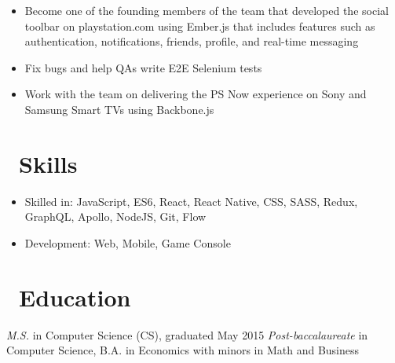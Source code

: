 \documentclass{resume}
\begin{document}
\begin{itemize}
  \item Become one of the founding members of the team that developed the social toolbar on playstation.com using Ember.js that includes features such as authentication, notifications, friends, profile, and real-time messaging
  \item Fix bugs and help QAs write E2E Selenium tests
\end{itemize}

\begin{itemize}
  \item Work with the team on delivering the PS Now experience on Sony and Samsung Smart TVs using Backbone.js
\end{itemize}


\section{\faCogs\ Skills}
\begin{itemize}[parsep=0.5ex]
  \item Skilled in: JavaScript, ES6, React, React Native, CSS, SASS, Redux, GraphQL, Apollo, NodeJS, Git, Flow
  \item Development: Web, Mobile, Game Console
\end{itemize}

\section{\faGraduationCap\ Education}
\textit{M.S.} in Computer Science (CS), graduated May 2015
\textit{Post-baccalaureate} in Computer Science, B.A. in Economics with minors in Math and Business


%
%
\end{document}
